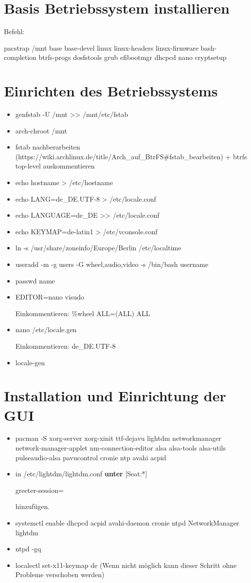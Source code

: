 \documentclass[11pt,a4paper]{article}
\begin{document}
\section{Basis Betriebssystem installieren}
Befehl:

pacstrap /mnt base base-devel linux linux-headers  linux-firmware  \textcolor{red}{} bash-completion btrfs-progs dosfstools grub efibootmgr dhcpcd nano cryptsetup
\section{Einrichten des Betriebssystems}
\begin{itemize}
\item genfstab -U /mnt >{}> /mnt/etc/fstab
\item arch-chroot /mnt
\item fstab nachberarbeiten (https://wiki.archlinux.de/title/Arch\_auf\_BtrFS\#fstab\_bearbeiten) + btrfs top-level auskommentieren
\item echo \grqq{}hostname\grqq{} > /etc/hostname
\item echo LANG=de\_DE.UTF-8 > /etc/locale.conf
\item echo LANGUAGE=de\_DE >{}> /etc/locale.conf
\item echo KEYMAP=de-latin1 > /etc/vconsole.conf
\item ln -s /usr/share/zoneinfo/Europe/Berlin /etc/localtime
\item useradd -m -g users -G wheel,audio,video -s /bin/bash \glqq{}username\grqq{} 
\item passwd \glqq{}name\grqq{}
\item EDITOR=nano visudo

Einkommentieren: \%wheel ALL=(ALL) ALL
\item nano /etc/locale.gen

Einkommentieren: de\_DE.UTF-8
\item locale-gen

\end{itemize}
\section{Installation und Einrichtung der GUI}
\begin{itemize}
\item pacman -S xorg-server xorg-xinit ttf-dejavu \textcolor{red}{} lightdm \textcolor{red}{}  networkmanager network-manager-applet nm-connection-editor alsa alsa-tools alsa-utils pulseaudio-alsa pavucontrol cronie ntp avahi acpid
\item in \glqq{}/etc/lightdm/lightdm.conf\grqq{} \textbf{unter} [Seat:*] 

greeter-session=\textcolor{red}{} 

hinzufügen.
\item systemctl enable dhcpcd acpid avahi-daemon cronie ntpd NetworkManager lightdm
\item ntpd -gq
\item localectl set-x11-keymap de (Wenn nicht möglich kann dieser Schritt ohne Probleme verschoben werden)
\end{itemize}
\end{document}
